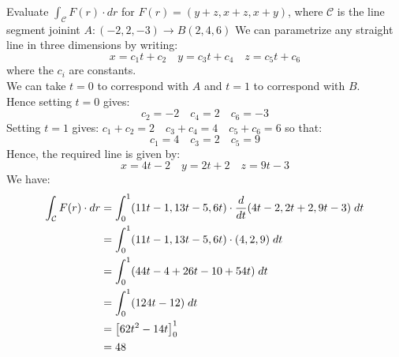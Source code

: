 \documentclass[a4paper, 10pt]{article}
\begin{document}
\begin{examplebox}{Evaluate $\int_{\mathcal{C}} F(r) \cdot dr$ for $F(r) = (y+z, x+z, x+y)$, where $\mathcal{C}$ is the line segment joinint $A:(-2,2,-3) \to B(2,4,6)$}{}
  We can parametrize any straight line in three dimensions by writing:
  $$x = c_1t + c_2 \quad y=c_3t + c_4 \quad z = c_5t + c_6$$
  where the $c_i$ are constants. \\
  We can take $t = 0$ to correspond with $A$ and $t = 1$ to correspond with $B$. \\
  Hence setting $t = 0$ gives:
  $$c_2 = -2 \quad  c_4 = 2 \quad c_6 = -3$$
  Setting $t = 1$ gives:
  $c_1 + c_2 = 2 \quad c_3 + c_4 = 4 \quad c_5 + c_6 = 6$ so that:
  $$c_1 = 4 \quad c_3 = 2 \quad c_5 = 9$$
  Hence, the required line is given by:
  $$x = 4t - 2 \quad y = 2t + 2 \quad z = 9t - 3$$
  We have:
  \begin{align*}
    \int_\mathcal{C} F(r) \cdot dr & = \int_0^1 (11t - 1, 13t -5,6t) \cdot \frac{d}{dt}(4t-2, 2t+2, 9t-3) \; dt \\
                                   & = \int_0^1 (11t - 1, 13t -5,6t) \cdot (4,2,9) \; dt                      \\
                                   & = \int_0^1 (44t - 4 + 26t - 10 + 54t) \; dt                              \\
                                   & = \int_0^1 (124t - 12) \; dt                                             \\
                                   & = \left[62t^2 - 14t\right]_0^1                                           \\
                                   & = 48
  \end{align*}
\end{examplebox}
\end{document}
